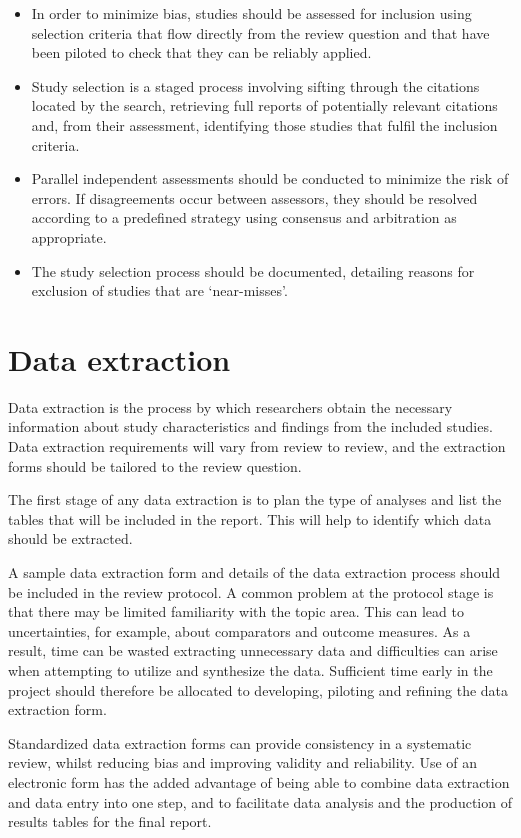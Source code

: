 \documentclass[
  11pt,
  a4paper,
  DIV=11,
  numbers=noendperiod]{scrreprt}
\begin{document}
\begin{itemize}
\item
  In order to minimize bias, studies should be assessed for inclusion
  using selection criteria that flow directly from the review question
  and that have been piloted to check that they can be reliably applied.
\item
  Study selection is a staged process involving sifting through the
  citations located by the search, retrieving full reports of
  potentially relevant citations and, from their assessment, identifying
  those studies that fulfil the inclusion criteria.
\item
  Parallel independent assessments should be conducted to minimize the
  risk of errors. If disagreements occur between assessors, they should
  be resolved according to a predefined strategy using consensus and
  arbitration as appropriate.
\item
  The study selection process should be documented, detailing reasons
  for exclusion of studies that are `near-misses'.
\end{itemize}

\section{Data extraction}\label{data-extraction}

Data extraction is the process by which researchers obtain the necessary
information about study characteristics and findings from the included
studies. Data extraction requirements will vary from review to review,
and the extraction forms should be tailored to the review question.

The first stage of any data extraction is to plan the type of analyses
and list the tables that will be included in the report. This will help
to identify which data should be extracted.

A sample data extraction form and details of the data extraction process
should be included in the review protocol. A common problem at the
protocol stage is that there may be limited familiarity with the topic
area. This can lead to uncertainties, for example, about comparators and
outcome measures. As a result, time can be wasted extracting unnecessary
data and difficulties can arise when attempting to utilize and
synthesize the data. Sufficient time early in the project should
therefore be allocated to developing, piloting and refining the data
extraction form.

Standardized data extraction forms can provide consistency in a
systematic review, whilst reducing bias and improving validity and
reliability. Use of an electronic form has the added advantage of being
able to combine data extraction and data entry into one step, and to
facilitate data analysis and the production of results tables for the
final report.
\end{document}
